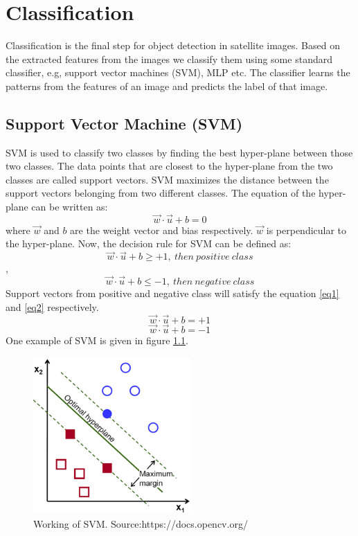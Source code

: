 \chapter{Classification}
Classification is the final step for object detection in satellite images. Based on the extracted features from the images we classify them using some standard classifier, e.g, support vector machines (SVM), MLP etc. The classifier learns the patterns from the features of an image and predicts the label of that image.

\section{Support Vector Machine (SVM)}
SVM \cite{b3} is used to classify two classes by finding the best hyper-plane between those two classes. The data points that are closest to the hyper-plane from the two classes are called support vectors. SVM maximizes the distance between the support vectors belonging from two different classes. The equation of the hyper-plane can be written as: 
$$\vec{w}\cdot \vec{u}+b=0$$ where $\vec{w}$ and $b$ are the weight vector and bias respectively. $\vec{w}$ is perpendicular to the hyper-plane. Now, the decision rule for SVM can be defined as:
$$\vec{w}\cdot \vec{u}+b\geq +1,\ then\ positive\ class$$ , $$\vec{w}\cdot \vec{u}+b\leq -1,\ then\ negative\ class$$
Support vectors from positive and negative class will satisfy the equation \ref{eq1} and \ref{eq2} respectively.
\begin{equation}
    \vec{w}\cdot \vec{u}+b=+1
    \label{eq1}
\end{equation}
\begin{equation}
    \vec{w}\cdot \vec{u}+b=-1
    \label{eq2}
\end{equation}
One example of SVM is given in figure \ref{fig13}.

\begin{figure}[!htbp]
\centerline{\includegraphics[height=60mm,width=60mm]{img/fig13.png}}
\caption{Working of SVM. Source:https://docs.opencv.org/}
\label{fig13}
\end{figure}

